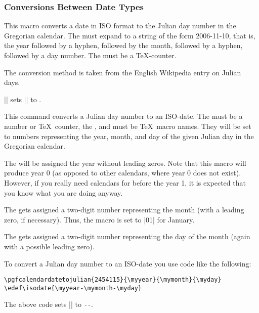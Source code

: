 \subsubsection{Conversions Between Date Types}

\begin{command}{\pgfcalendardatetojulian{}}
  This macro converts a date in ISO format to the Julian day number in
  the Gregorian calendar. The  must expand to a string of the form
  2006-11-10, that is, the year followed by a hyphen, followed by the
  month, followed by a hyphen, followed by a day number. The
   must be a \TeX-counter. 
  
  The conversion method is taken from the English Wikipedia entry on
  Julian days. 

  \newcount\mycount
  \example || sets
  |\mycount| to \the\mycount.
\end{command}

\begin{command}{\pgfcalendarjuliantodate{}}
  This command converts a Julian day number to an ISO-date. The
   must be a number or \TeX\ counter, the ,
   and  must be \TeX\ macro
  names. They will be set to numbers representing the year, month, and
  day of the given Julian day in the Gregorian calendar.

  The  will be assigned the year without leading
  zeros. Note that this macro will produce year 0 (as opposed to other
  calendars, where year 0 does not exist). However, if you really need
  calendars for before the year 1, it is expected that you know what
  you are doing anyway.

  The  gets assigned a two-digit number representing
  the month (with a leading zero, if necessary). Thus, the macro is
  set to |01| for January.

  The  gets assigned a two-digit number representing
  the day of the month (again with a possible leading zero).

  To convert a Julian day number to an ISO-date you use code like the
  following:
\begin{verbatim}
\pgfcalendardatetojulian{2454115}{\myyear}{\mymonth}{\myday}
\edef\isodate{\myyear-\mymonth-\myday}
\end{verbatim}
  The above code sets |\isodate| to
  \edef\isodate{\myyear-\mymonth-\myday}\texttt{\isodate}.
\end{command}


